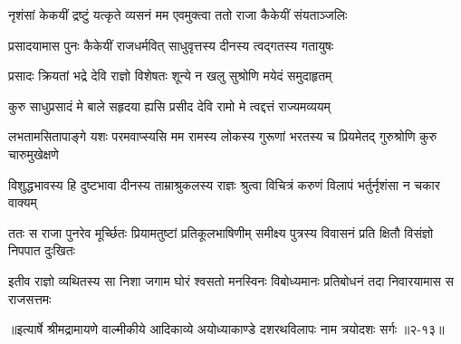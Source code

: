 \twolineshloka
{नृशंसां केकयीं द्रष्टुं यत्कृते व्यसनं मम}
{एवमुक्त्वा ततो राजा कैकेयीं संयताञ्जलिः} %

\twolineshloka
{प्रसादयामास पुनः कैकेयीं राजधर्मवित्}
{साधुवृत्तस्य दीनस्य त्वद्गतस्य गतायुषः} %

\twolineshloka
{प्रसादः क्रियतां भद्रे देवि राज्ञो विशेषतः}
{शून्ये न खलु सुश्रोणि मयेदं समुदाहृतम्} %

\twolineshloka
{कुरु साधुप्रसादं मे बाले सहृदया ह्यसि}
{प्रसीद देवि रामो मे त्वद्दत्तं राज्यमव्ययम्} %

\threelineshloka
{लभतामसितापाङ्गे यशः परमवाप्स्यसि}
{मम रामस्य लोकस्य गुरूणां भरतस्य च}
{प्रियमेतद् गुरुश्रोणि कुरु चारुमुखेक्षणे} %

\twolineshloka
{विशुद्धभावस्य हि दुष्टभावा दीनस्य ताम्राश्रुकलस्य राज्ञः}
{श्रुत्वा विचित्रं करुणं विलापं भर्तुर्नृशंसा न चकार वाक्यम्} %

\twolineshloka
{ततः स राजा पुनरेव मूर्च्छितः प्रियामतुष्टां प्रतिकूलभाषिणीम्}
{समीक्ष्य पुत्रस्य विवासनं प्रति क्षितौ विसंज्ञो निपपात दुःखितः} %

\twolineshloka
{इतीव राज्ञो व्यथितस्य सा निशा जगाम घोरं श्वसतो मनस्विनः}
{विबोध्यमानः प्रतिबोधनं तदा निवारयामास स राजसत्तमः} %


॥इत्यार्षे श्रीमद्रामायणे वाल्मीकीये आदिकाव्ये अयोध्याकाण्डे दशरथविलापः नाम त्रयोदशः सर्गः ॥२-१३॥
